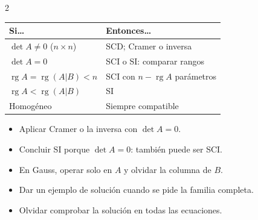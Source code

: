 \documentclass[10pt]{article}
\begin{document}
\begin{multicols}{2}
\begin{tabular}{@{}p{3.3cm}p{4.5cm}@{}}
\textbf{Si\ldots} & \textbf{Entonces\ldots}\\ \hline
\(\det A\ne0\) (\(n\times n\)) & SCD; Cramer o inversa\\
\(\det A=0\) & SCI o SI: comparar rangos\\
\(\operatorname{rg}A=\operatorname{rg}(A|B)<n\) & SCI con \(n-\operatorname{rg}A\) parámetros\\
\(\operatorname{rg}A<\operatorname{rg}(A|B)\) & SI\\
Homogéneo & Siempre compatible
\end{tabular}

\begin{ojo}
\begin{itemize}
  \item Aplicar Cramer o la inversa con \(\det A=0\).
  \item Concluir SI porque \(\det A=0\): también puede ser SCI.
  \item En Gauss, operar solo en \(A\) y olvidar la columna de \(B\).
  \item Dar un ejemplo de solución cuando se pide la familia completa.
  \item Olvidar comprobar la solución en todas las ecuaciones.
\end{itemize}
\end{ojo}

\end{multicols}
\end{document}
